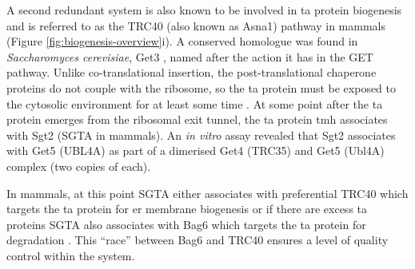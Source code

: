 A second redundant system is also known to be involved in \gls{ta} protein biogenesis and is referred to as the TRC40 (also known as Asna1) pathway in mammals (Figure \ref{fig:biogenesis-overview}i).
A conserved homologue was found in \textit{Saccharomyces cerevisiae}, Get3 \cite{Schuldiner2008}, named after the action it has in the GET pathway.
Unlike co-translational insertion, the post\--translational chaperone proteins do not couple with the ribosome, so the \gls{ta} protein must be exposed to the cytosolic environment for at least some time \cite{Guna2018}.
At some point after the \gls{ta} protein emerges from the ribosomal exit tunnel, the \gls{ta} protein \gls{tmh} associates with Sgt2 (SGTA in mammals).
An \textit{in vitro} assay revealed that Sgt2 associates with Get5  \cite{Wang2010} (UBL4A) as part of a dimerised Get4 (TRC35) and Get5 (Ubl4A) complex (two copies of each)\cite{Chang2010, Chang2012, Chartron2010, Chartron2012}.

In mammals, at this point SGTA either associates with preferential TRC40 which targets the \gls{ta} protein for \gls{er} membrane biogenesis or if there are excess \gls{ta} proteins SGTA also associates with Bag6 which targets the \gls{ta} protein for degradation \cite{Shao2017}.
This ``race'' between Bag6 and TRC40 ensures a level of quality control within the system.

